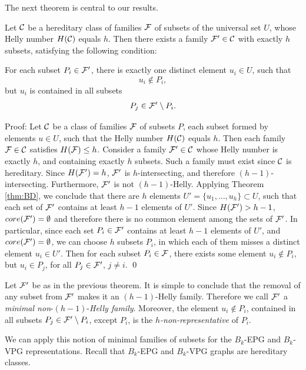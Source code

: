 The next theorem is central to our results.

\begin{theorem}\label{thm:minimal}
Let ${\cal C}$ be a hereditary class of families ${\cal F}$ of subsets of the universal set $U$, whose Helly number $H({\cal C})$ equals $h$. Then there exists a family ${\cal F'} \in {\cal C}$ with exactly $h$ subsets, satisfying the following condition: 

For each subset $P_i \in \cal {F'}$, there is exactly one distinct element $u_i \in U$, such that \\
$$u_i \not \in P_i,$$ 
but $u_i$ is contained in all  subsets 
$$P_j \in {\cal F'} \setminus P_i.$$
\end{theorem}
 

Proof: 
Let ${\cal C}$ be a class of families ${\cal F}$ of subsets $P$, each subset formed by elements $u \in U$, such that the Helly number $H({\cal C})$ equals $h$. Then each family ${\cal F} \in {\cal C}$ satisfies $H({\cal F}) \leq h$. Consider a family ${\cal F'} \in {\cal C}$  whose Helly number is exactly $h$, and containing exactly $h$ subsets. Such a family must exist since ${\cal C}$ is hereditary. Since $H({\cal F'}) = h$, $\cal F'$ is $h$-intersecting, and therefore $(h-1)$-intersecting. Furthermore, ${\cal F'}$ is not $(h-1)$-Helly. Applying  Theorem \ref{thm:BD}, we conclude that there are $h$ elements $U' = \{u_1, \ldots, u_h\} \subset U$, such that each set of ${\cal F'}$ contains at least $h-1$ elements of $U'$. Since $H({\cal F'}) > h-1$, $core({\cal F'}) = \emptyset$ and therefore there is no common element among the sets of $\cal F'$. In particular, since each set $P_i \in {\cal F'}$ contains at least $h-1$ elements of $U'$, and $core(\cal F') = \emptyset$, we can choose $h$ subsets $P_i$, in which each of them misses a distinct element $u_i \in U'$. Then for each subset $P_i \in \cal F$, there exists some element $u_i \not \in P_i$, but $u_i \in P_j$, for all $P_j \in \cal F'$, $j \neq i$. \qed

Let $\cal{ F'}$ be as in the previous theorem. It is simple to conclude that the removal of any subset from $\cal {F'}$ makes it an $(h-1)$-Helly family. Therefore we  call $\cal {F'}$ a {\it minimal non}-$(h-1)$-{\it Helly family}. Moreover, the element $u_i \not \in P_i$, contained in all subsets $P_j \in {\cal{F'}} \setminus P_i$, except $P_i$, is the {\it $h$-non-representative} of $P_i$.  

We can apply this notion of minimal families of subsets for the $B_k$-EPG and $B_k$-VPG representations. Recall that $B_k$-EPG and $B_k$-VPG graphs are hereditary classes. 

